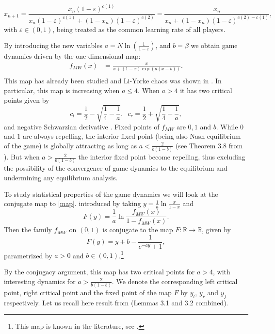 \documentclass[format=acmsmall, authorversion, screen=true]{acmart}
\def\R{\ensuremath{\mathbb{R}}}
\newcommand{\eps}{\varepsilon}
\begin{document}
\begin{equation}\label{mwu}
x_{n+1}=\frac{x_n(1-\eps)^{c(1)}}{x_n(1-\eps)^{c(1)}+
(1-x_n)(1-\eps)^{c(2)}}
           =\frac{x_n}{x_n+
(1-x_n)(1-\eps)^{c(2)-c(1)}},%
\end{equation}
with $\eps\in(0,1)$, being treated as the common learning rate of
all players.

By introducing the new variables $a=N \ln\left(\frac1{1-\eps}\right)$, and $b=\beta$ we obtain game dynamics driven by the one-dimensional map:
\begin{equation}\label{map}
\begin{aligned}
f_{MW}(x)&=\frac{x}{x+(1-x)\exp(a(x-b))}.\\
\end{aligned}
\tag{MW}
\end{equation}
This map has already been studied and Li-Yorke chaos was shown in \cite{chotibut2021family,CFMP2019}.
In particular, this map is increasing when $a\leq 4$. When $a>4$ it has two critical points given by
\[c_l=\frac 12-\sqrt{\frac 14-\frac 1a},\;\; c_r=\frac 12+\sqrt{\frac 14-\frac 1a},\]
and negative Schwarzian derivative \cite{chotibut2021family}. Fixed points of $f_{MW}$ are $0,1$ and $b$. While $0$ and $1$ are always repelling, the interior fixed point (being also Nash equilibrium of the game) is globally attracting as long as $a<\frac{2}{b(1-b)}$ (see Theorem 3.8 from \cite{chotibut2021family}). But when $a>\frac{2}{b(1-b)}$ the interior fixed point become repelling, thus excluding the possibility of the convergence of game dynamics to the equilibrium and undermining any equilibrium analysis. 

To study statistical properties of the game dynamics we will look at the conjugate map to \eqref{map}.
introduced by taking $y=\frac 1a \ln\frac{x}{1-x}$ and \[F(y)=\frac 1a
\ln \frac{f_{MW}(x)}{1-f_{MW}(x)}.\] Then the family  $f_{MW}$ on $(0,1)$ is conjugate to the map  
$F\colon \R\to\R$, given by
\begin{equation}\label{e2}
F(y)=y+b-\frac1{e^{-ay}+1},
\end{equation}
parametrized by $a>0$ and $b\in (0,1)$.\footnote{This map is known in the literature, see \cite{eirola1996chaotic,kryzhevich2021bistability,bielawski2025interval}.} %


By the conjugacy argument, this map has two critical points for $a>4$, with interesting dynamics for $a>\frac{2}{b(1-b)}$.
We denote the corresponding left critical point, right critical point and the fixed point of the map $F$ by $y_l$, $y_r$ and $y_f$ respectively.
Let us recall here result from \cite{bielawski2025interval} (Lemmas 3.1 and 3.2 combined).
\end{document}
